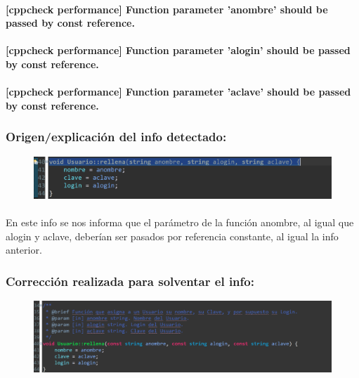 		\paragraph{[cppcheck performance] Function parameter 'anombre' should be passed by const reference.}
		
		\paragraph{[cppcheck performance] Function parameter 'alogin' should be passed by const reference.}
		
		\paragraph{[cppcheck performance] Function parameter 'aclave' should be passed by const reference.}
	
		\subsubsection{Origen/explicación del info detectado:}
		
			\begin{figure}[H]
				\centering
				\includegraphics[scale=0.55]{img/esteban12.png}
				\label{esteban12}
			\end{figure}
		
			\paragraph{}En este info se nos informa que el parámetro de la función anombre, al igual que alogin y aclave, deberían ser pasados por referencia constante, al igual la info anterior.
			
		\subsubsection{Corrección realizada para solventar el info:}
		
			\begin{figure}[H]
				\centering
				\includegraphics[scale=0.55]{img/esteban13.png}
				\label{esteban13}
			\end{figure}
		
